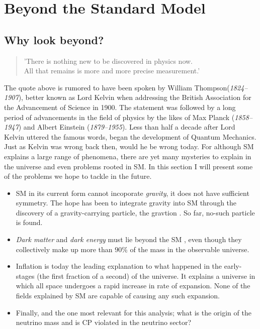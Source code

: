 \section{Beyond the Standard Model}
\subsection{Why look beyond?}
\begin{center}
    \hyphenblockcquote{UKenglish}{Kelvin}{
        'There is nothing new to be discovered in physics now.\\
        All that remains is more and more precise measurement.'
        }
\end{center}
The quote above is rumored to have been spoken by William Thompson(\emph{1824–1907}), better
known as Lord Kelvin when addressing the British Association for the Advancement
of Science in 1900. The statement was followed by a long period of advancements in the
field of physics by the likes of Max Planck (\emph{1858–1947}) and 
Albert Einstein (\emph{1879–1955}). Less than half a decade after Lord Kelvin
uttered the famous words, began the development of Quantum Mechanics. 
Just as Kelvin was wrong back then, would he be wrong today. For although \ac{SM} explains 
a large range of phenomena, there are yet many mysteries to explain in the universe and even 
problems rooted in \ac{SM}. In this section I will present some of the problems we hope to 
tackle in the future. 
\begin{itemize}
    \item \ac{SM} in its current form cannot incoporate \emph{gravity}, it does not have sufficient symmetry. 
    The hope has been to integrate gravity into \ac{SM} through the discovery of a gravity-carrying particle, 
    the gravtion \cite{Graviton}. So far, no-such particle is found.
    \item \emph{Dark matter} and \emph{dark energy} must lie beyond the \ac{SM} \cite{DarkME}, even though they 
    collectively make up more than $90\%$ of the mass in the observable universe.
    \item Inflation is today the leading explanation to what happened in the early-stages
    (the first fraction of a second) of the universe. It explains a universe in which all space
    undergoes a rapid increase in rate of expansion. None of the fields explained by \ac{SM} are 
    capable of causing any such expansion.
    \item Finally, and the one most relevant for this analysis; what is the origin of the neutrino 
    mass and is \ac{CP} violated in the neutrino sector? 
\end{itemize}
